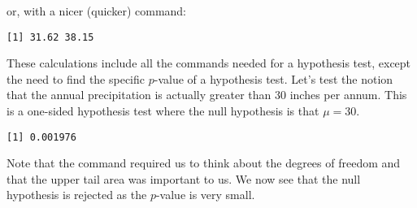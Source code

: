 or, with a nicer (quicker) command: 
\begin{knitrout}
\color{fgcolor}\begin{kframe}
\begin{alltt}
\hlstd{> } \hlopt{+} \hlstd{(}\hlopt{-}\hlstd{,}\hlstd{)} \hlopt{*} \hlstd{(}\hlstd{,} \hlopt{-}\hlstd{)} \hlopt{*}  \hlopt{/} \hlstd{(}
\end{alltt}
\begin{verbatim}
[1] 31.62 38.15
\end{verbatim}
\end{kframe}
\end{knitrout}
These calculations include all the commands needed for a hypothesis test, except the need to find the specific $p$-value of a hypothesis test. Let's test the notion that the annual precipitation is actually greater than 30 inches per annum. This is a one-sided hypothesis test where the null hypothesis is that $\mu=30$. 
\begin{knitrout}
\color{fgcolor}\begin{kframe}
\begin{alltt}
\hlstd{> }\hlkwb{=} \hlstd{(}\hlopt{-}\hlstd{)}\hlopt{/}\hlstd{(} \hlopt{/} \hlstd{(}
\hlstd{> } \hlopt{-}\hlstd{,} \hlstd{=}\hlstd{)}
\end{alltt}
\begin{verbatim}
[1] 0.001976
\end{verbatim}
\end{kframe}
\end{knitrout}
 Note that the  command required us to think about the degrees of freedom and that the upper tail area was important to us. We now see that the null hypothesis is rejected as the $p$-value is very small. 
 
